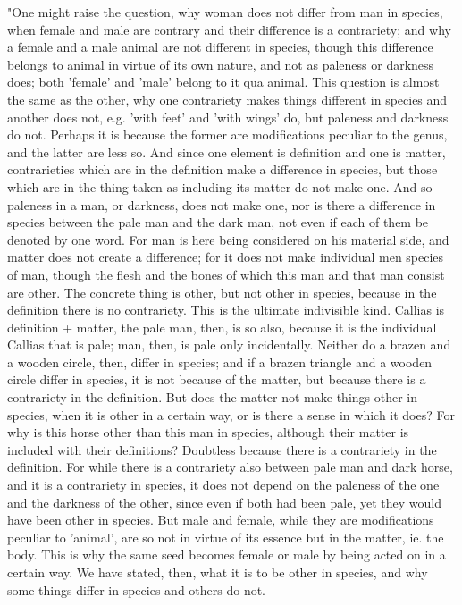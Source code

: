 "One might raise the question, why woman does not differ from man
in species, when female and male are contrary and their difference
is a contrariety; and why a female and a male animal are not different
in species, though this difference belongs to animal in virtue of
its own nature, and not as paleness or darkness does; both 'female'
and 'male' belong to it qua animal. This question is almost the same
as the other, why one contrariety makes things different in species
and another does not, e.g. 'with feet' and 'with wings' do, but paleness
and darkness do not. Perhaps it is because the former are modifications
peculiar to the genus, and the latter are less so. And since one element
is definition and one is matter, contrarieties which are in the definition
make a difference in species, but those which are in the thing taken
as including its matter do not make one. And so paleness in a man,
or darkness, does not make one, nor is there a difference in species
between the pale man and the dark man, not even if each of them be
denoted by one word. For man is here being considered on his material
side, and matter does not create a difference; for it does not make
individual men species of man, though the flesh and the bones of which
this man and that man consist are other. The concrete thing is other,
but not other in species, because in the definition there is no contrariety.
This is the ultimate indivisible kind. Callias is definition + matter,
the pale man, then, is so also, because it is the individual Callias
that is pale; man, then, is pale only incidentally. Neither do a brazen
and a wooden circle, then, differ in species; and if a brazen triangle
and a wooden circle differ in species, it is not because of the matter,
but because there is a contrariety in the definition. But does the
matter not make things other in species, when it is other in a certain
way, or is there a sense in which it does? For why is this horse other
than this man in species, although their matter is included with their
definitions? Doubtless because there is a contrariety in the definition.
For while there is a contrariety also between pale man and dark horse,
and it is a contrariety in species, it does not depend on the paleness
of the one and the darkness of the other, since even if both had been
pale, yet they would have been other in species. But male and female,
while they are modifications peculiar to 'animal', are so not in virtue
of its essence but in the matter, ie. the body. This is why the same
seed becomes female or male by being acted on in a certain way. We
have stated, then, what it is to be other in species, and why some
things differ in species and others do not. 

